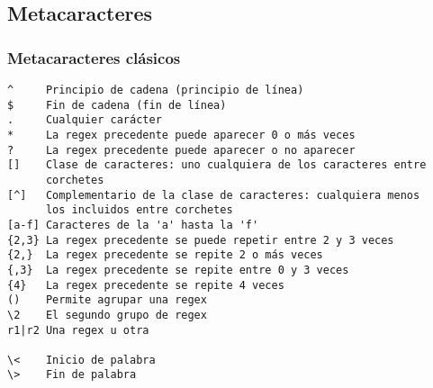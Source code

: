 \documentclass[ucs]{beamer}
\begin{document}
\subsection{Metacaracteres}
\begin{frame}[fragile]
\frametitle{Metacaracteres clásicos}

  \begin{footnotesize}
  \begin{verbatim}
^     Principio de cadena (principio de línea)
$     Fin de cadena (fin de línea)
.     Cualquier carácter 
*     La regex precedente puede aparecer 0 o más veces 
?     La regex precedente puede aparecer o no aparecer
[]    Clase de caracteres: uno cualquiera de los caracteres entre 
      corchetes
[^]   Complementario de la clase de caracteres: cualquiera menos 
      los incluidos entre corchetes
[a-f] Caracteres de la 'a' hasta la 'f'
{2,3} La regex precedente se puede repetir entre 2 y 3 veces
{2,}  La regex precedente se repite 2 o más veces
{,3}  La regex precedente se repite entre 0 y 3 veces
{4}   La regex precedente se repite 4 veces
()    Permite agrupar una regex
\2    El segundo grupo de regex  
r1|r2 Una regex u otra

\<    Inicio de palabra
\>    Fin de palabra  
  \end{verbatim}
  \end{footnotesize}
\end{frame}
\end{document}
